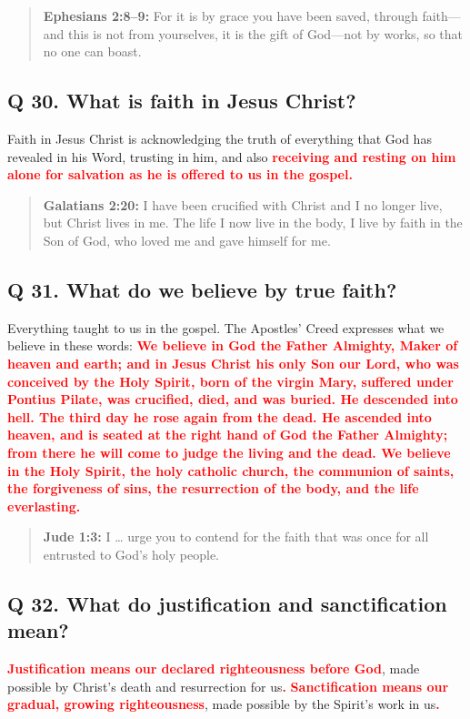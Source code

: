 \documentclass[titlepage]{memoir}
\newcommand\Children[1]{\textbf{\textcolor{red}{#1}}}
\newcommand\Quote[2]{\begin{quote}{\small\textbf{#1:}{ #2}}\end{quote}}
\begin{document}
\Quote{Ephesians 2:8--9}{For it is by grace you have been saved, through faith\thinspace{}---\thinspace{}and this is not from yourselves, it is the gift of God\thinspace{}---\thinspace{}not by works, so that no one can boast.}

\subsection{Q 30. What is faith in Jesus Christ?}
Faith in Jesus Christ is acknowledging the truth of everything that God has revealed in his Word, trusting in him, and also \Children{receiving and resting on him alone for salvation as he is offered to us in the gospel.}

\Quote{Galatians 2:20}{I have been crucified with Christ and I no longer live, but Christ lives in me. The life I now live in the body, I live by faith in the Son of God, who loved me and gave himself for me.}

\subsection{Q 31. What do we believe by true faith?}
Everything taught to us in the gospel. The Apostles' Creed expresses what we believe in these words: \Children{We believe in God the Father Almighty, Maker of heaven and earth; and in Jesus Christ his only Son our Lord, who was conceived by the Holy Spirit, born of the virgin Mary, suffered under Pontius Pilate, was crucified, died, and was buried. He descended into hell. The third day he rose again from the dead. He ascended into heaven, and is seated at the right hand of God the Father Almighty; from there he will come to judge the living and the dead. We believe in the Holy Spirit, the holy catholic church, the communion of saints, the forgiveness of sins, the resurrection of the body, and the life everlasting.}

\Quote{Jude 1:3}{I {\dots} urge you to contend for the faith that was once for all entrusted to God's holy people.}

\subsection{Q 32. What do justification and sanctification mean?}
\Children{Justification means our declared righteousness before God}, made possible by Christ's death and resurrection for us\Children{.} \Children{Sanctification means our gradual, growing righteousness}, made possible by the Spirit's work in us\Children{.}
\end{document}
